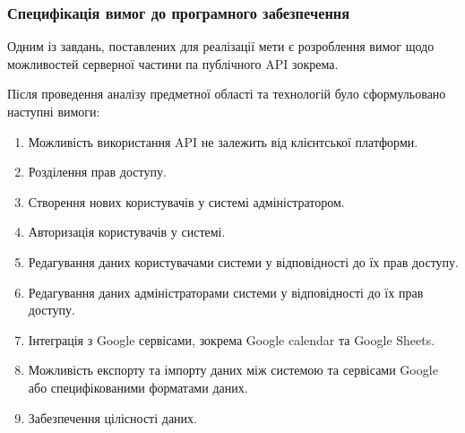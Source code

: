 \subsubsection{Специфікація вимог до програмного забезпечення}

Одним із завдань, поставлених для реалізації мети є розроблення вимог щодо можливостей серверної частини па публічного API зокрема.

Після проведення аналізу предметної області та технологій було сформульовано наступні вимоги:

\begin{enumerate}
    \item Можливість використання API не залежить від клієнтської платформи.
    \item Розділення прав доступу.
    \item Створення нових користувачів у системі адміністратором.
    \item Авторизація користувачів у системі.
    \item Редагування даних користувачами системи у відповідності до їх прав доступу.
    \item Редагування даних адміністраторами системи у відповідності до їх прав доступу.
    \item Інтеграція з Google сервісами, зокрема Google calendar та Google Sheets.
    \item Можливість експорту та імпорту даних між системою та сервісами Google або специфікованими форматами даних.
    \item Забезпечення цілісності даних.
\end{enumerate}

